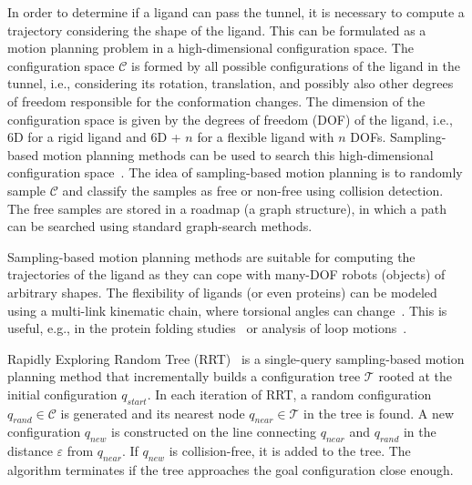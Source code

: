 \documentclass[letterpaper, 10 pt, conference]{ieeeconf} %
\def\qrand{q_{rand}}
\def\qstart{q_{start}}
\def\qinit{\qstart}
\def\qnear{q_{near}}
\def\qnew{q_{new}}
\def\T{\mathcal{T}}
\def\C{\mathcal{C}}
\begin{document}
In order to determine if a ligand can pass the tunnel, it is necessary to compute a trajectory considering the shape of the ligand.
This can be formulated as a motion planning problem in a high-dimensional configuration space.
The configuration space $\C$ is formed by all possible configurations of the ligand in the tunnel, i.e., considering its rotation, translation, and possibly also other degrees of freedom responsible for the conformation changes.
The dimension of the configuration space is given by the degrees of freedom (DOF) of the ligand, i.e., 6D for a rigid ligand and 6D + $n$ for a flexible
ligand with $n$ DOFs.
Sampling-based motion planning methods can be used to search this high-dimensional configuration space~\cite{Lav06}.
The idea of sampling-based motion planning is to randomly sample $\C$ and classify the samples as free or non-free using collision detection.
The free samples are stored in a roadmap (a graph structure), in which a path can be searched using standard graph-search methods.

Sampling-based motion planning methods are suitable for computing the trajectories of the ligand as they 
can cope with many-DOF robots (objects) of arbitrary shapes.
The flexibility of ligands (or even proteins) can be modeled using a multi-link kinematic chain, where torsional angles
can change~\cite{songPFpath}.
This is useful, e.g., in the protein folding studies~\cite{al2012motion,gipson2012computational,amato2002using,raveh2009rapid} or analysis of loop motions~\cite{cortes2004geometric}.

Rapidly Exploring Random Tree (RRT)~\cite{lavalleRRT} is a single-query sampling-based motion planning method that 
incrementally builds a configuration tree $\T$ rooted at the initial configuration $\qinit$.
In each iteration of RRT, a random configuration $\qrand \in \C$ is generated and its nearest node $\qnear \in \T$ in the tree is found.
A new configuration $\qnew$ is constructed on the line connecting $\qnear$ and $\qrand$ in the distance $\varepsilon$ from $\qnear$.
If $\qnew$ is collision-free, it is added to the tree.
The algorithm terminates if the tree approaches the goal configuration close enough.
\end{document}
